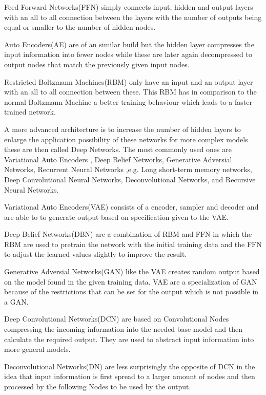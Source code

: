 \documentclass[conference]{IEEEtran}
\begin{document}
Feed Forward Networks(FFN) simply connects input, hidden and output layers with an all to all connection between the layers with the number of outputs being equal or smaller to the number of hidden nodes.

Auto Encoders(AE) are of an similar build but the hidden layer compresses the input information into fewer nodes while these are later again decompressed to output nodes that match the previously given input nodes.

Restricted Boltzmann Machines(RBM) only have an input and an output layer with an all to all connection between these. This RBM has in comparison to the normal Boltzmann Machine a better training behaviour which leads to a faster trained network.

A more advanced architecture is to increase the number of hidden layers to enlarge the application possibility of these networks for more complex models these are then called Deep Networks. The most commonly used ones are Variational Auto Encoders , Deep Belief Networks, Generative Adversial Networks, Recurrent Neural Networks ,e.g. Long short-term memory networks, Deep Convolutional Neural Networks, Deconvolutional Networks, and Recursive Neural Networks.

Variational Auto Encoders(VAE) consists of a encoder, sampler and decoder and are able to to generate output based on specification given to the VAE. 

Deep Belief Networks(DBN) are a combination of RBM and FFN in which the RBM are used to pretrain the network with the initial training 
data and the FFN to adjust the learned values slightly to improve the result. 

Generative Adversial Networks(GAN) like the VAE creates random output based on the model found in the given training data. VAE are a specialization of GAN because of the restrictions that can be set for the output which is not possible in a GAN.

Deep Convolutional Networks(DCN) are based on Convolutional Nodes compressing the incoming information into the needed base model and then calculate the required output.\cite{PattersonGibson17} They are used to abstract input information into more general models.

Deconvolutional Networks(DN)\cite{zeiler2014visualizing} are less surprisingly the opposite of DCN in the idea that input information is first spread to a larger amount of nodes and then processed by the following Nodes to be used by the output.
\end{document}
